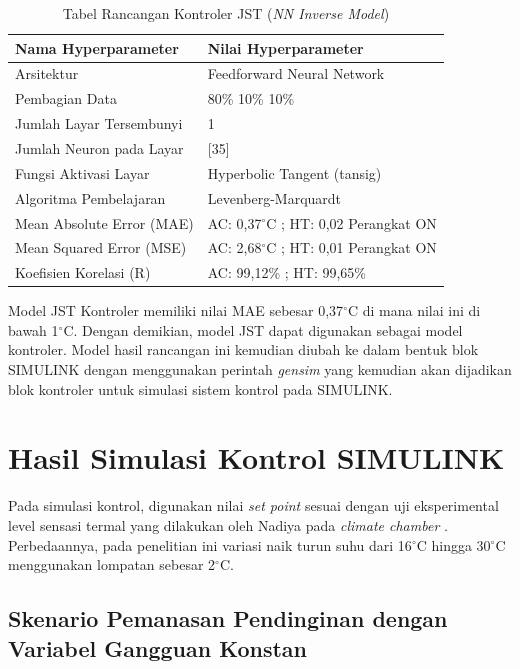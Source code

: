 \begin{table}[!h]
	\caption{Tabel Rancangan Kontroler JST (\textit{NN Inverse Model})}
	\label{tbl:5:NNControl}
	\centering
	\begin{tabular}{|p{5.7cm}|p{6.5cm}|}
		\hline
		\textbf{Nama Hyperparameter} & \textbf{Nilai Hyperparameter} \\ \hline
		Arsitektur & Feedforward Neural Network \\ \hline
		Pembagian Data & 80\% 10\% 10\% \\ \hline 
		Jumlah Layar Tersembunyi & 1 \\ \hline
		Jumlah Neuron pada Layar & [35] \\ \hline
		Fungsi Aktivasi Layar & Hyperbolic Tangent (tansig) \\ \hline
		Algoritma Pembelajaran & Levenberg-Marquardt \\ \hline
		Mean Absolute Error (MAE) & AC: 0,37$^\circ$C ; HT: 0,02 Perangkat ON\\ \hline
		Mean Squared Error (MSE) & AC: 2,68$^\circ$C ; HT: 0,01 Perangkat ON\\ \hline
		Koefisien Korelasi (R) & AC: 99,12\% ; HT: 99,65\% \\ \hline
	\end{tabular}
\end{table}

Model JST Kontroler memiliki nilai MAE sebesar 0,37$^\circ$C di mana nilai ini di bawah 1$^\circ$C. Dengan demikian, model JST dapat digunakan sebagai model kontroler. Model hasil rancangan ini kemudian diubah ke dalam bentuk blok SIMULINK dengan menggunakan perintah \textit{gensim} yang kemudian akan dijadikan blok kontroler untuk simulasi sistem kontrol pada SIMULINK.

\section{Hasil Simulasi Kontrol SIMULINK}

Pada simulasi kontrol, digunakan nilai \textit{set point} sesuai dengan uji eksperimental level sensasi termal yang dilakukan oleh Nadiya pada \textit{climate chamber} \cite{skripsiMuna}. Perbedaannya, pada penelitian ini variasi naik turun suhu dari 16$^\circ$C hingga 30$^\circ$C menggunakan lompatan sebesar 2$^\circ$C.

\subsection{Skenario Pemanasan Pendinginan dengan Variabel Gangguan Konstan}

